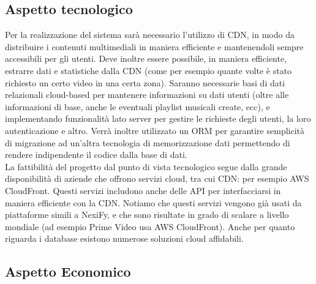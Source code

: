 \subsection{Aspetto tecnologico}
Per la realizzazione del sistema sarà necessario l'utilizzo di CDN, in modo da distribuire i contenuti multimediali in maniera efficiente e mantenendoli sempre accessibili per gli utenti. Deve inoltre essere possibile, in maniera efficiente, estrarre dati e statistiche dalla CDN (come per esempio quante volte è stato richiesto un certo video in una certa zona). Saranno necessarie basi di dati relazionali cloud-based per mantenere informazioni su dati utenti (oltre alle informazioni di base, anche le eventuali playlist musicali create, ecc), e implementando funzionalità lato server per gestire le richieste degli utenti, la loro autenticazione e altro. Verrà inoltre utilizzato un ORM per garantire semplicità di migrazione ad un'altra tecnologia di memorizzazione dati permettendo di rendere indipendente il codice dalla base di dati.\\
La fattibilità del progetto dal punto di vista tecnologico segue dalla grande disponibilità di aziende che offrono servizi cloud, tra cui CDN: per esempio AWS CloudFront. Questi servizi includono anche delle API per interfacciarsi in maniera efficiente con la CDN. Notiamo che questi servizi vengono già usati da piattaforme simili a NexiFy, e che sono risultate in grado di scalare a livello mondiale (ad esempio Prime Video usa AWS CloudFront). Anche per quanto riguarda i database esistono numerose soluzioni cloud affidabili.



\subsection{Aspetto Economico}
